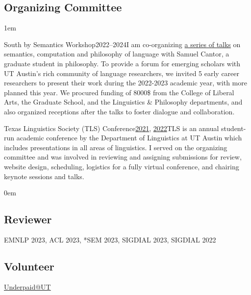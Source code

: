 \subsection{Organizing Committee}

\leftskip1em\relax

\smallentry
  {\large South by Semantics Workshop}{2022--2024}{I am co-organizing \href{https://sites.utexas.edu/sxsemantics/}{a series of talks} on semantics, computation and philosophy of language with Samuel Cantor, a graduate student in philosophy. To provide a forum for emerging scholars with UT Austin's rich community of language researchers, we invited 5 early career researchers to present their work during the 2022-2023 academic year, with more planned this year. We procured funding of 8000\$ from the College of Liberal Arts, the Graduate School, and the Linguistics \& Philosophy departments, and also  organized receptions after the talks to foster dialogue and collaboration.}
  
\smallentry
    {\large Texas Linguistics Society (TLS) Conference}{\href{http://tls.ling.utexas.edu/2021/}{2021}, \href{http://tls.ling.utexas.edu/2022/}{2022}}{TLS is an annual student-run academic conference by the Department of Linguistics at UT Austin which includes presentations in all areas of linguistics. I served on the organizing committee and was involved in reviewing and assigning submissions for review, website design, scheduling, logistics for a fully virtual conference, and chairing keynote sessions and talks.}

\leftskip0em\relax

\subsection{Reviewer}

\quad EMNLP 2023, ACL 2023, *SEM 2023, SIGDIAL 2023, SIGDIAL 2022

\subsection{Volunteer}

\quad \href{https://twitter.com/UnderpaidatUT}{Underpaid\makeatletter @\makeatother UT}
